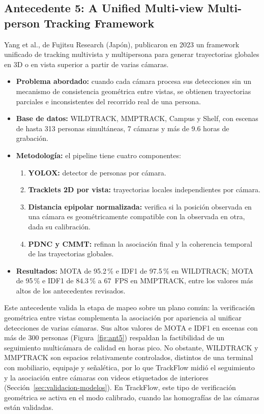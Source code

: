 \documentclass[12pt,a4paper]{article}
\begin{document}
\subsection{\texorpdfstring{Antecedente 5: A Unified Multi-view Multi-person Tracking Framework~\cite{yang2023}}{Antecedente 5: A Unified Multi-view Multi-person Tracking Framework}}

Yang et al., de Fujitsu Research (Japón), publicaron en 2023 un framework
unificado de tracking multivista y multipersona para generar trayectorias
globales en 3D o en vista superior a partir de varias cámaras.

\begin{itemize}
    \item \textbf{Problema abordado:} cuando cada cámara procesa sus
    detecciones sin un mecanismo de consistencia geométrica entre vistas,
    se obtienen trayectorias parciales e inconsistentes del recorrido
    real de una persona.

    \item \textbf{Base de datos:} WILDTRACK, MMPTRACK, Campus y Shelf,
    con escenas de hasta 313 personas simultáneas, 7 cámaras y más de 9.6
    horas de grabación.

    \item \textbf{Metodología:} el pipeline tiene cuatro componentes:
    \begin{enumerate}
        \item \textbf{YOLOX:} detector de personas por cámara.
        \item \textbf{Tracklets 2D por vista:} trayectorias locales
        independientes por cámara.
        \item \textbf{Distancia epipolar normalizada:} verifica si la
        posición observada en una cámara es geométricamente compatible
        con la observada en otra, dada su calibración.
        \item \textbf{PDNC y CMMT:} refinan la asociación final y la
        coherencia temporal de las trayectorias globales.
    \end{enumerate}

    \item \textbf{Resultados:} MOTA de 95.2\,\% e IDF1 de 97.5\,\% en
    WILDTRACK; MOTA de 95\,\% e IDF1 de 84.3\,\% a 67~FPS en MMPTRACK,
    entre los valores más altos de los antecedentes revisados.
\end{itemize}

Este antecedente valida la etapa de mapeo sobre un plano común: la
verificación geométrica entre vistas complementa la asociación por
apariencia al unificar detecciones de varias cámaras. Sus altos valores
de MOTA e IDF1 en escenas con más de 300 personas
(Figura~\ref{fig:ant5}) respaldan la
factibilidad de un seguimiento multicámara de calidad en horas pico. No
obstante, WILDTRACK y MMPTRACK son espacios relativamente controlados,
distintos de una terminal con mobiliario, equipaje y señalética, por lo
que TrackFlow midió el seguimiento y la asociación entre cámaras con
videos etiquetados de interiores (Sección~\ref{sec:validacion-modelos}).
En TrackFlow, este tipo de verificación geométrica se activa en el modo
calibrado, cuando las homografías de las cámaras están validadas.
\end{document}
